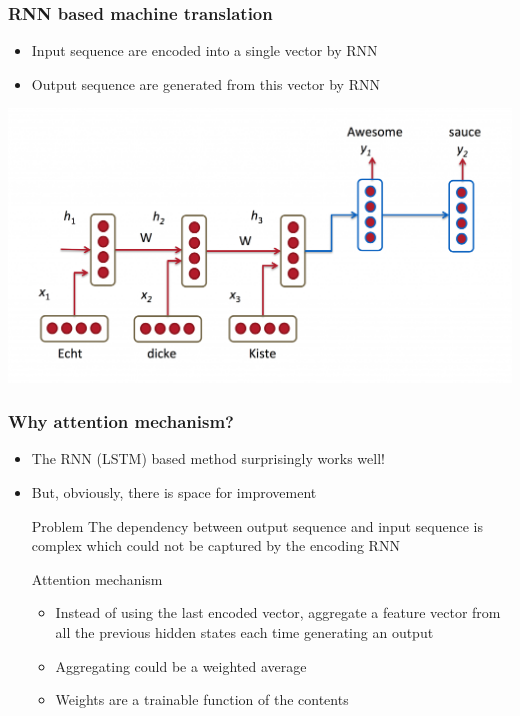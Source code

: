 \documentclass[compress]{beamer}
\begin{document}
\begin{frame}
  \frametitle{RNN based machine translation}
  \begin{itemize}
  \item Input sequence are encoded into a single vector by RNN
  \item Output sequence are generated from this vector by RNN
  \end{itemize}
  \begin{center}
    \includegraphics[scale=0.3]{translation.png}
  \end{center}
\end{frame}

\begin{frame}
  \frametitle{Why attention mechanism?}
  \begin{itemize}
  \item The RNN (LSTM) based method surprisingly works well!
  \item But, obviously, there is space for improvement
    \begin{alertblock}{Problem}
      The dependency between output sequence and input sequence is
      complex which could not be captured by the encoding RNN
    \end{alertblock}
    \begin{block}{Attention mechanism}
      \begin{itemize}
      \item Instead of using the last encoded vector, aggregate a
        feature vector from all the previous hidden states each time
        generating an output
      \item Aggregating could be a weighted average
      \item Weights are a trainable function of the contents
      \end{itemize}
    \end{block}
  \end{itemize}
\end{frame}
\end{document}

